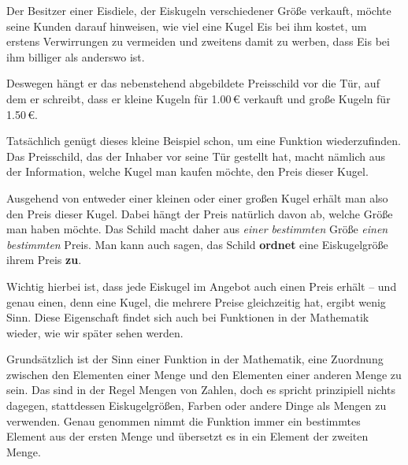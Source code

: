 \documentclass[../../main.tex]{subfiles}
\begin{document}
\begin{example}{}
    Der Besitzer einer Eisdiele, der Eiskugeln verschiedener Größe verkauft, möchte seine Kunden darauf hinweisen, wie viel eine Kugel Eis bei ihm kostet, um erstens Verwirrungen zu vermeiden und zweitens damit zu werben, dass Eis bei ihm billiger als anderswo ist.
    
    Deswegen hängt er das nebenstehend abgebildete Preisschild vor die Tür, auf dem er schreibt, dass er kleine Kugeln für 1.00\,\euro{} verkauft und große Kugeln für 1.50\,\euro.
    
    Tatsächlich genügt dieses kleine Beispiel schon, um eine Funktion wiederzufinden. Das Preisschild, das der Inhaber vor seine Tür gestellt hat, macht nämlich aus der Information, welche Kugel man kaufen möchte, den Preis dieser Kugel.
    
    Ausgehend von entweder einer kleinen oder einer großen Kugel erhält man also den Preis dieser Kugel. Dabei hängt der Preis natürlich davon ab, welche Größe man haben möchte. Das Schild macht daher aus \emph{einer bestimmten} Größe \emph{einen bestimmten} Preis. Man kann auch sagen, das Schild \textbf{ordnet} eine Eiskugelgröße ihrem Preis \textbf{zu}.
    
    Wichtig hierbei ist, dass jede Eiskugel im Angebot auch einen Preis erhält -- und genau einen, denn eine Kugel, die mehrere Preise gleichzeitig hat, ergibt wenig Sinn. Diese Eigenschaft findet sich auch bei Funktionen in der Mathematik wieder, wie wir später sehen werden.
\end{example}

Grundsätzlich ist der Sinn einer Funktion in der Mathematik, eine Zuordnung zwischen den Elementen einer Menge und den Elementen einer anderen Menge zu sein. Das sind in der Regel Mengen von Zahlen, doch es spricht prinzipiell nichts dagegen, stattdessen Eiskugelgrößen, Farben oder andere Dinge als Mengen zu verwenden. Genau genommen nimmt die Funktion immer ein bestimmtes Element aus der ersten Menge und übersetzt es in ein Element der zweiten Menge.
\end{document}

